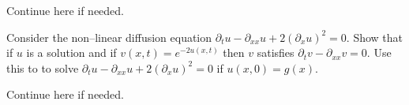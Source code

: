 \documentclass[12pt]{exam}
\newcommand{\px}{\partial_x}
\newcommand{\pt}{\partial_t}
\newcommand{\pxx}{\partial_{xx}}
\begin{document}
\begin{questions}
\newpage 
\begin{solutionorbox}[\stretch{1}]
Continue here if needed. 
\end{solutionorbox}


\newpage 
\begin{question}
Consider the non--linear diffusion equation $\pt u - \pxx u + 2(\px u)^2 = 0$. Show that if $u$ is a solution
and if $v(x,t) = e^{-2u(x,t)}$ then $v$ satisfies $\pt v - \pxx v = 0$. Use this to to solve 
$\pt u - \pxx u + 2(\px u)^2 = 0$ if $u(x,0) = g(x)$.
\end{question}
\begin{solutionorbox}[\stretch{1}]
\end{solutionorbox}

\newpage 
\begin{solutionorbox}[\stretch{1}]
Continue here if needed. 
\end{solutionorbox}



\end{questions}
\end{document}
